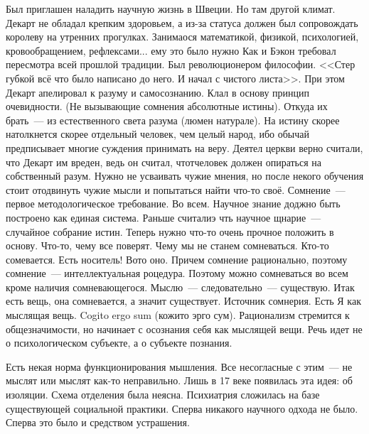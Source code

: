 Был приглашен наладить научную жизнь в Швеции. Но там другой климат. Декарт не обладал крепким здоровьем, а из-за статуса должен был сопровождать королеву на утренних прогулках. Занимаося математикой, физикой, психологией, кровообращением, рефлексами... ему это было нужно
Как и Бэкон требовал пересмотра всей прошлой традиции. Был революционером философии. <<Стер губкой всё что было написано до него. И начал с чистого листа>>. При этом Декарт апелировал к разуму и самосознанию. Клал в основу принцип очевидности. (Не вызывающие сомнения абсолютные истины). Откуда их брать~--- из естественного света разума (люмен натурале). На истину скорее натолкнется скорее отдельный человек, чем целый народ, ибо обычай предписывает многие суждения принимать на веру. Деятел церкви верно считали, что Декарт им вреден, ведь он считал, чтотчеловек должен опираться на собственный разум. Нужно не усваивать чужие мнения, но после некого обучения стоит отодвинуть чужие мысли и попытаться найти что-то своё.
Сомнение~--- первое методологическое требование. Во всем.
Научное знание доджно быть построено как единая система. Раньше считалиэ чть научное щнарие~--- случайное собрание истин. Теперь нужно что-то очень прочное положить в основу. Что-то, чему все поверят.
Чему мы не станем сомневаться. Кто-то сомевается. Есть носитель! Вото оно. Причем сомнение рационально, поэтому сомнение~--- интеллектуальная роцедура. Поэтому можно сомневаться во всем кроме наличия сомневающегося. Мыслю~--- следовательно~--- существую. Итак есть вещь, она сомневается, а значит существует. Источник сомнерия. Есть Я как мыслящая вещь. Cogito ergo sum (кожито эрго сум). Рационализм стремится к общезначимости, но начинает с осознания себя как мыслящей вещи. Речь идет не о психологическом субъекте, а о субъекте познания.

Есть некая норма функционирования мышления. Все несогласные с этим~--- не мыслят или мыслят как-то неправильно. Лишь в 17 веке появилась эта идея: об изоляции. Схема отделения была неясна. Психиатрия сложилась на базе существующей социальной практики. Сперва никакого научного одхода не было. Сперва это было и средством устрашения.

